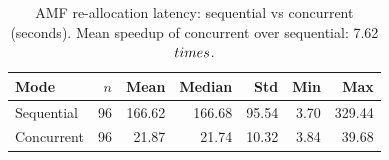 \begin{table}[htbp]
\centering
\caption{AMF re-allocation latency: sequential vs concurrent (seconds). Mean speedup of concurrent over sequential: 7.62$\\times$.}
\label{tab:comparison}
\begin{tabular}{lrrrrrr}
\hline
Mode & $n$ & Mean & Median & Std & Min & Max \\
\hline
Sequential & 96 & 166.62 & 166.68 & 95.54 & 3.70 & 329.44 \\
Concurrent & 96 & 21.87 & 21.74 & 10.32 & 3.84 & 39.68 \\
\hline
\end{tabular}
\end{table}
